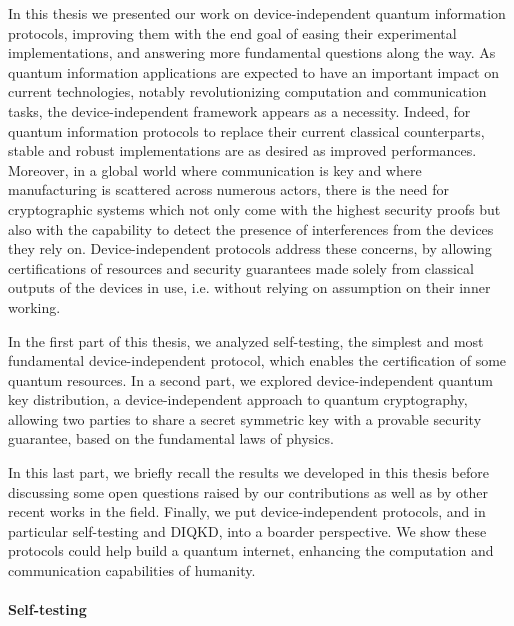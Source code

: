 In this thesis we presented our work on device-independent quantum information protocols, improving them with the end goal of easing their experimental implementations, and answering more fundamental questions along the way.
As quantum information applications are expected to have an important impact on current technologies, notably revolutionizing computation and communication tasks, the device-independent framework appears as a necessity.
Indeed, for quantum information protocols to replace their current classical counterparts, stable and robust implementations are as desired as improved performances. 
Moreover, in a global world where communication is key and where manufacturing is scattered across numerous actors, there is the need for cryptographic systems which not only come with the highest security proofs but also with the capability to detect the presence of interferences from the devices they rely on.
Device-independent protocols address these concerns, by allowing certifications of resources and security guarantees made solely from classical outputs of the devices in use, i.e. without relying on assumption on their inner working. 

In the first part of this thesis, we analyzed self-testing, the simplest and most fundamental device-independent protocol, which enables the certification of some quantum resources.
In a second part, we explored device-independent quantum key distribution, a device-independent approach to quantum cryptography, allowing two parties to share a secret symmetric key with a provable security guarantee, based on the fundamental laws of physics. 

In this last part, we briefly recall the results we developed in this thesis before discussing some open questions raised by our contributions as well as by other recent works in the field.
Finally, we put device-independent protocols, and in particular self-testing and DIQKD, into a boarder perspective.
We show these protocols could help build a quantum internet, enhancing the computation and communication capabilities of humanity.

\paragraph{Self-testing} 

